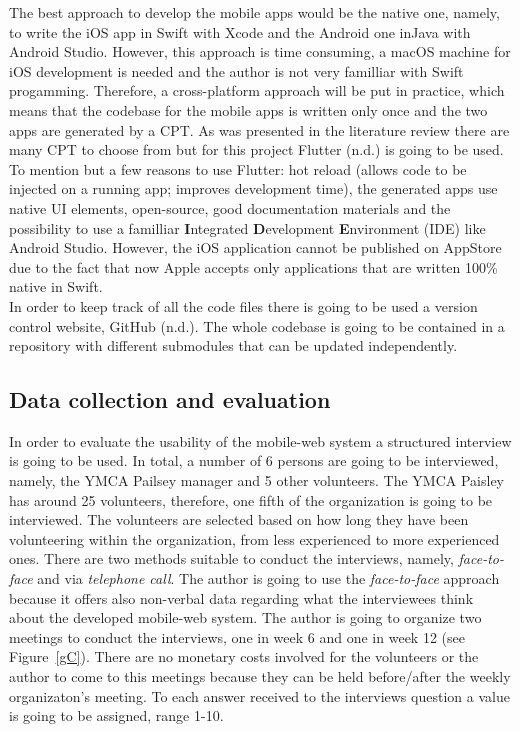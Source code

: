 \documentclass[version=last,fontsize=13pt]{scrartcl}
\begin{document}
	The best approach to develop the mobile apps would be the native one, namely, to write the iOS app in Swift with Xcode and the Android one inJava with Android Studio. However, this approach is time consuming, a macOS machine for iOS development is needed and the author is not very familliar with Swift progamming. Therefore, a cross-platform approach will be put in practice, which means that the codebase for the mobile apps is written only once and the two apps are generated by a CPT. As was presented in the literature review there are many CPT to choose from but for this project Flutter (n.d.) is going to be used. To mention but a few reasons to use Flutter: hot reload (allows code to be injected on a running app; improves development time), the generated apps use native UI elements, open-source, good documentation materials and the possibility to use a familliar \textbf{I}ntegrated \textbf{D}evelopment \textbf{E}nvironment (IDE) like Android Studio. However, the iOS application cannot be published on AppStore due to the fact that now Apple accepts only applications that are written 100\% native in Swift.\\
	\indent
	In order to keep track of all the code files there is going to  be used a version control website, GitHub (n.d.). The whole codebase is going to be contained in a repository with different submodules that can be updated independently. 
	

\subsection{Data collection and evaluation}
	In order to evaluate the usability of the mobile-web system  a structured interview is going to be used. In total, a number of 6 persons are going to be interviewed, namely, the YMCA Pailsey manager and 5 other volunteers. The YMCA Paisley has around 25 volunteers, therefore, one fifth of the organization is going to be interviewed. The volunteers are selected based on how long they have been volunteering within the organization, from less experienced to more experienced ones. There are two methods suitable to conduct the interviews, namely, \textit{face-to-face} and via \textit{telephone call}. %
	The author is going to use the \textit{face-to-face} approach because it offers also non-verbal data regarding what the interviewees think about the developed mobile-web system.  The author is going to organize two meetings to conduct the interviews, one in week 6 and one in week 12 (see Figure~\ref{gC}). There are no monetary costs involved for the volunteers or the author to come to this meetings because they can be held before/after the weekly organizaton's meeting. To each answer received to the interviews question a value is going to be assigned, range 1-10.
\end{document}
